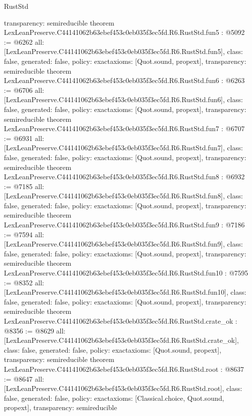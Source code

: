 \begin{lexlean}{RustStd}
\begin{coremodule}
{  transparency: semireducible
}
theorem LexLeanPreserve.C44141062b63ebef453c0eb035f3ec5fd.R6.RustStd.fun5 : @5092 := @6262 {
  all: [LexLeanPreserve.C44141062b63ebef453c0eb035f3ec5fd.R6.RustStd.fun5],
  class: false,
  generated: false,
  policy: exact{axioms: [Quot.sound, propext]},
  transparency: semireducible
}
theorem LexLeanPreserve.C44141062b63ebef453c0eb035f3ec5fd.R6.RustStd.fun6 : @6263 := @6706 {
  all: [LexLeanPreserve.C44141062b63ebef453c0eb035f3ec5fd.R6.RustStd.fun6],
  class: false,
  generated: false,
  policy: exact{axioms: [Quot.sound, propext]},
  transparency: semireducible
}
theorem LexLeanPreserve.C44141062b63ebef453c0eb035f3ec5fd.R6.RustStd.fun7 : @6707 := @6931 {
  all: [LexLeanPreserve.C44141062b63ebef453c0eb035f3ec5fd.R6.RustStd.fun7],
  class: false,
  generated: false,
  policy: exact{axioms: [Quot.sound, propext]},
  transparency: semireducible
}
theorem LexLeanPreserve.C44141062b63ebef453c0eb035f3ec5fd.R6.RustStd.fun8 : @6932 := @7185 {
  all: [LexLeanPreserve.C44141062b63ebef453c0eb035f3ec5fd.R6.RustStd.fun8],
  class: false,
  generated: false,
  policy: exact{axioms: [Quot.sound, propext]},
  transparency: semireducible
}
theorem LexLeanPreserve.C44141062b63ebef453c0eb035f3ec5fd.R6.RustStd.fun9 : @7186 := @7594 {
  all: [LexLeanPreserve.C44141062b63ebef453c0eb035f3ec5fd.R6.RustStd.fun9],
  class: false,
  generated: false,
  policy: exact{axioms: [Quot.sound, propext]},
  transparency: semireducible
}
theorem LexLeanPreserve.C44141062b63ebef453c0eb035f3ec5fd.R6.RustStd.fun10 : @7595 := @8352 {
  all: [LexLeanPreserve.C44141062b63ebef453c0eb035f3ec5fd.R6.RustStd.fun10],
  class: false,
  generated: false,
  policy: exact{axioms: [Quot.sound, propext]},
  transparency: semireducible
}
theorem LexLeanPreserve.C44141062b63ebef453c0eb035f3ec5fd.R6.RustStd.crate_ok : @8356 := @8629 {
  all: [LexLeanPreserve.C44141062b63ebef453c0eb035f3ec5fd.R6.RustStd.crate_ok],
  class: false,
  generated: false,
  policy: exact{axioms: [Quot.sound, propext]},
  transparency: semireducible
}
theorem LexLeanPreserve.C44141062b63ebef453c0eb035f3ec5fd.R6.RustStd.root : @8637 := @8647 {
  all: [LexLeanPreserve.C44141062b63ebef453c0eb035f3ec5fd.R6.RustStd.root],
  class: false,
  generated: false,
  policy: exact{axioms: [Classical.choice, Quot.sound, propext]},
  transparency: semireducible
}


\end{coremodule}
\end{lexlean}
